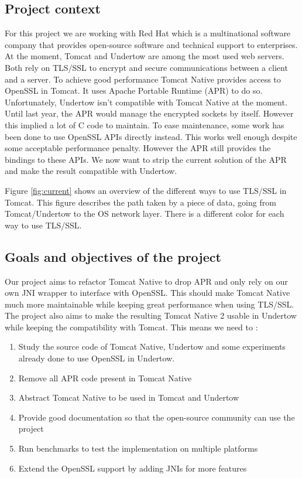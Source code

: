 \documentclass[11pt,a4paper,bibliography=totocnumbered]{scrartcl}
\def\mytitle{Tomcat Native 2}
\def\theclient{Red Hat}
\begin{document}
\subsection{Project context}
For this project we are working with \theclient{} which is a multinational software company that provides open-source software and technical support to enterprises\autocite{redhat}.
At the moment, Tomcat\autocite{tomcat} and Undertow\autocite{undertow} are among the most used web servers. Both rely on TLS/SSL to encrypt and secure communications between a client and a server. To achieve good performance Tomcat Native\autocite{tomcat-native} provides access to OpenSSL in Tomcat. It uses Apache Portable Runtime (APR) to do so. 
Unfortunately, Undertow isn't compatible with Tomcat Native at the moment.
Until last year, the APR would manage the encrypted sockets by itself. However this implied a lot of C code to maintain. To ease maintenance, some work has been done to use OpenSSL APIs directly instead. This works well enough despite some acceptable performance penalty. However the APR still provides the bindings to these APIs.
We now want to strip the current solution of the APR and make the result compatible with Undertow.

Figure \ref{fig:current} shows an overview of the different ways to use TLS/SSL in Tomcat. This figure describes the path taken by a piece of data, going from Tomcat/Undertow to the OS network layer. There is a different color for each way to use TLS/SSL.

\subsection{Goals and objectives of the project}

Our project aims to refactor Tomcat Native to drop APR and only rely on our own JNI wrapper to interface with OpenSSL. This should make Tomcat Native much more maintainable while keeping great performance when using TLS/SSL. The project also aims to make the resulting \mytitle{} usable in Undertow while keeping the compatibility with Tomcat.
This means we need to :
\begin{enumerate}
\item Study the source code of Tomcat Native, Undertow and some experiments already done to use OpenSSL in Undertow.
\item Remove all APR code present in Tomcat Native
\item Abstract Tomcat Native to be used in Tomcat and Undertow
\item Provide good documentation so that the open-source community can use the project
\item Run benchmarks to test the implementation on multiple platforms
\item Extend the OpenSSL support by adding JNIs for more features
\end{enumerate}
\end{document}
